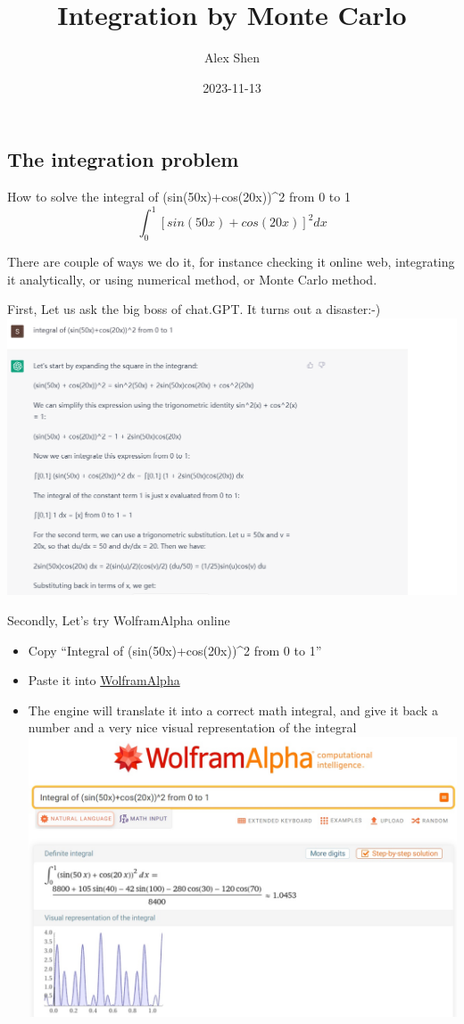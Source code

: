 \documentclass[
]{article}
\title{Integration by Monte Carlo}
\author{Alex Shen}
\date{2023-11-13}
\providecommand{\tightlist}{%
  \setlength{\itemsep}{0pt}\setlength{\parskip}{0pt}}
\begin{document}
\maketitle

{
\setcounter{tocdepth}{2}
\tableofcontents
}
\hypertarget{the-integration-problem}{%
\subsection{The integration problem}\label{the-integration-problem}}

How to solve the integral of (sin(50x)+cos(20x))\^{}2 from 0 to 1
\[\int_0^1 [sin(50x)+cos(20x)]^2 dx\]

There are couple of ways we do it, for instance checking it online web,
integrating it analytically, or using numerical method, or Monte Carlo
method.

First, Let us ask the big boss of chat.GPT. It turns out a disaster:-)
\includegraphics{./fig/chat.gpt.png}

Secondly, Let's try WolframAlpha online

\begin{itemize}
\tightlist
\item
  Copy ``Integral of (sin(50x)+cos(20x))\^{}2 from 0 to 1''
\item
  Paste it into \href{https://www.wolframalpha.com/}{WolframAlpha}
\item
  The engine will translate it into a correct math integral, and give it
  back a number and a very nice visual representation of the integral
  \includegraphics{./fig/math.fig.jpg}
\end{itemize}
\end{document}
